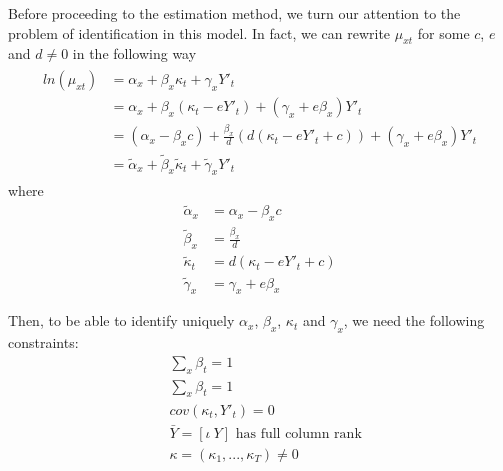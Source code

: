 \documentclass[AER, draftmode]{AEA}
\begin{document}
Before proceeding to the estimation method, we turn our attention to the problem of identification in this model. In fact, we can rewrite $\mu_{xt}$ for some $c$, $e$ and $d\neq 0 $ in the following way
\begin{align}\label{eq:par_2}
\begin{split}
ln(\mu_{xt}) &= \alpha_x+\beta_x \kappa_t + \gamma_x Y'_t \\
&= \alpha_x+\beta_x (\kappa_t - eY'_t)+ (\gamma_x + e\beta_x)Y'_t \\
&= (\alpha_x-\beta_xc)+\frac{\beta_x}{d} (d(\kappa_t - eY'_t+c))+ (\gamma_x + e\beta_x) Y'_t \\
&= \tilde{\alpha}_x+\tilde{\beta}_x \tilde{\kappa}_t + \tilde{\gamma}_x Y'_t
\end{split}
\end{align}
where
\begin{align}
\tilde{\alpha}_x &= \alpha_x - \beta_x c\\
\tilde{\beta}_x &= \frac{\beta_x}{d} \\
\tilde{\kappa}_t &= d(\kappa_t - eY'_t+c)\\
\tilde{\gamma}_x &= \gamma_x + e\beta_x
\end{align}

Then, to be able to identify uniquely $\alpha_x$, $\beta_x$, $\kappa_t$ and $\gamma_x$, we need the following constraints:
\begin{align}
& \sum_x \beta_t = 1 \\ \label{eq:beta_2}
& \sum_x \beta_t = 1 \\ \label{eq:alpha_2}
& cov(\kappa_t, Y'_t) = 0 \\ \label{eq:cov_2}
& \bar{Y} = [\iota \ Y] \text{ has full column rank} \\ \label{eq:col_2}
& \kappa = (\kappa_1,..., \kappa_T) \neq 0 
\end{align}
\end{document}

